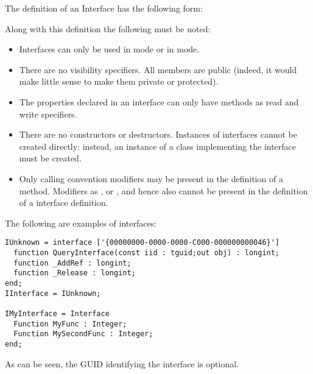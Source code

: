 The definition of an Interface has the following
form:

Along with this definition the following must be noted:
\begin{itemize}
\item Interfaces can only be used in  mode or in 
mode.
\item There are no visibility specifiers. All members are public (indeed,
it would make little sense to make them private or
protected).
\item The properties declared in an interface can only have methods as read and
write specifiers.
\item There are no constructors or destructors. Instances of interfaces
cannot be created directly: instead, an instance of a class implementing 
the interface must be created.
\item Only calling convention modifiers may be present in the definition of
a method. Modifiers as ,  or , and
hence also  cannot be present in the definition of a interface
definition.
\end{itemize}
The following are examples of interfaces:
\begin{verbatim}
IUnknown = interface ['{00000000-0000-0000-C000-000000000046}']
  function QueryInterface(const iid : tguid;out obj) : longint;
  function _AddRef : longint;
  function _Release : longint;
end;
IInterface = IUnknown;

IMyInterface = Interface
  Function MyFunc : Integer;
  Function MySecondFunc : Integer;
end;
\end{verbatim}
As can be seen, the GUID identifying the interface is optional.

